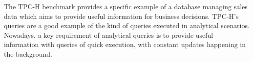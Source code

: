 
The TPC-H benchmark \cite{tpch, dbtoaster, partView, lazyMaintenance} provides a specific example of a database managing sales data which aims to provide useful information for business decisions.
TPC-H's queries are a good example of the kind of queries executed in analytical scenarios.
Nowadays, a key requirement of analytical queries is to provide useful information with queries of quick execution, with constant updates happening in the background.

 


